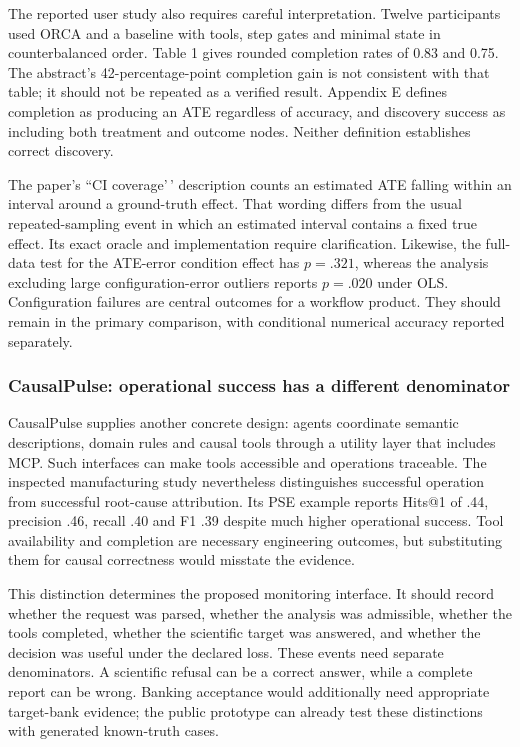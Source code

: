 The reported user study also requires careful interpretation. Twelve
participants used ORCA and a baseline with tools, step gates and minimal
state in counterbalanced order. Table 1 gives rounded completion rates
of 0.83 and 0.75. The abstract's 42-percentage-point completion gain is
not consistent with that table; it should not be repeated as a verified
result. Appendix E defines completion as producing an ATE regardless of
accuracy, and discovery success as including both treatment and outcome
nodes. Neither definition establishes correct discovery.
\cite{exec13_census_orca}

The paper's ``CI coverage'\,' description counts an estimated ATE
falling within an interval around a ground-truth effect. That wording
differs from the usual repeated-sampling event in which an estimated
interval contains a fixed true effect. Its exact oracle and
implementation require clarification. Likewise, the full-data test for
the ATE-error condition effect has \(p=.321\), whereas the analysis
excluding large configuration-error outliers reports \(p=.020\) under
OLS. Configuration failures are central outcomes for a workflow product.
They should remain in the primary comparison, with conditional numerical
accuracy reported separately.

\hypertarget{causalpulse-operational-success-has-a-different-denominator}{%
\subsubsection{CausalPulse: operational success has a different
denominator}\label{causalpulse-operational-success-has-a-different-denominator}}

CausalPulse supplies another concrete design: agents coordinate semantic
descriptions, domain rules and causal tools through a utility layer that
includes MCP. Such interfaces can make tools accessible and operations
traceable. The inspected manufacturing study nevertheless distinguishes
successful operation from successful root-cause attribution. Its PSE
example reports Hits@1 of .44, precision .46, recall .40 and F1 .39
despite much higher operational success. Tool availability and
completion are necessary engineering outcomes, but substituting them for
causal correctness would misstate the evidence. \cite{exec13_pulse}

This distinction determines the proposed monitoring interface. It should
record whether the request was parsed, whether the analysis was
admissible, whether the tools completed, whether the scientific target
was answered, and whether the decision was useful under the declared
loss. These events need separate denominators. A scientific refusal can
be a correct answer, while a complete report can be wrong. Banking
acceptance would additionally need appropriate target-bank evidence; the
public prototype can already test these distinctions with generated
known-truth cases.

